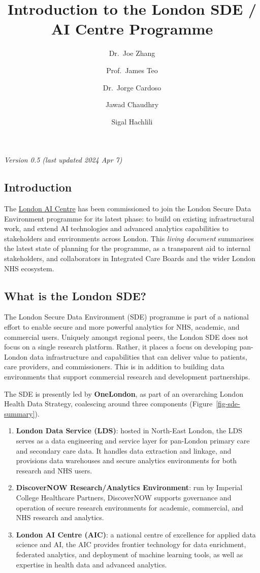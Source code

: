 \documentclass[
  letterpaper,
  DIV=11,
  numbers=noendperiod]{scrartcl}
\title{Introduction to the London SDE / AI Centre Programme}
\author{Dr.~Joe Zhang \and Prof.~James Teo \and Dr.~Jorge
Cardoso \and Jawad Chaudhry \and Sigal Hachlili}
\date{}
\begin{document}
\maketitle

\emph{Version 0.5 (last updated 2024 Apr 7)}

\subsection{Introduction}\label{introduction}

The \href{https://www.aicentre.co.uk/}{London AI Centre} has been
commissioned to join the London Secure Data Environment programme for
its latest phase: to build on existing infrastructural work, and extend
AI technologies and advanced analytics capabilities to stakeholders and
environments across London. This \emph{living document} summarises the
latest state of planning for the programme, as a transparent aid to
internal stakeholders, and collaborators in Integrated Care Boards and
the wider London NHS ecosystem.

\subsection{What is the London SDE?}\label{what-is-the-london-sde}

The London Secure Data Environment (SDE) programme is part of a national
effort to enable secure and more powerful analytics for NHS, academic,
and commercial users. Uniquely amongst regional peers, the London SDE
does not focus on a single research platform. Rather, it places a focus
on developing pan-London data infrastructure and capabilities that can
deliver value to patients, care providers, and commissioners. This is in
addition to building data environments that support commercial research
and development partnerships.

The SDE is presently led by \textbf{OneLondon}, as part of an
overarching London Health Data Strategy, coalescing around three
components (Figure~\ref{fig-sde-summary}).

\begin{enumerate}
\def\labelenumi{(\arabic{enumi})}
\item
  \textbf{London Data Service (LDS)}: hosted in North-East London, the
  LDS serves as a data engineering and service layer for pan-London
  primary care and secondary care data. It handles data extraction and
  linkage, and provisions data warehouses and secure analytics
  environments for both research and NHS users.
\item
  \textbf{DiscoverNOW Research/Analytics Environment}: run by Imperial
  College Healthcare Partners, DiscoverNOW supports governance and
  operation of secure research environments for academic, commercial,
  and NHS research and analytics.
\item
  \textbf{London AI Centre (AIC)}: a national centre of excellence for
  applied data science and AI, the AIC provides frontier technology for
  data enrichment, federated analytics, and deployment of machine
  learning tools, as well as expertise in health data and advanced
  analytics.
\end{enumerate}
\end{document}
